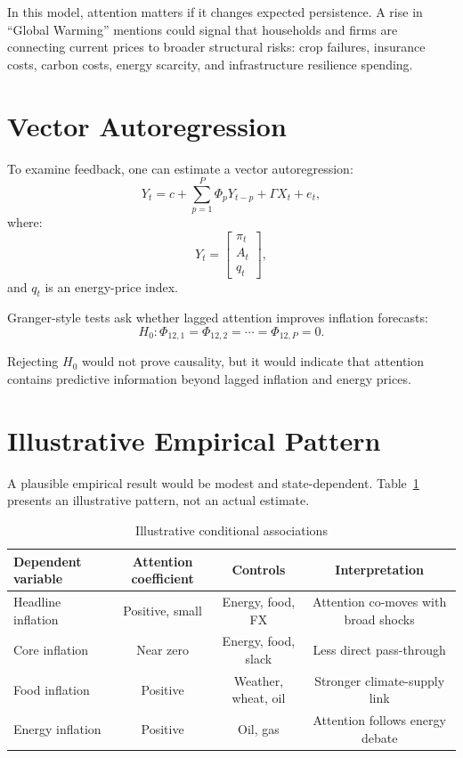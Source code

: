 \documentclass[12pt]{article}
\begin{document}
In this model, attention matters if it changes expected persistence. A rise in ``Global Warming'' mentions could signal that households and firms are connecting current prices to broader structural risks: crop failures, insurance costs, carbon costs, energy scarcity, and infrastructure resilience spending.

\section{Vector Autoregression}

To examine feedback, one can estimate a vector autoregression:
\begin{equation}
    Y_t = c + \sum_{p=1}^{P} \Phi_p Y_{t-p} + \Gamma X_t + e_t,
\end{equation}
where:
\begin{equation}
    Y_t =
    \begin{bmatrix}
    \pi_t \\
    A_t \\
    q_t
    \end{bmatrix},
\end{equation}
and $q_t$ is an energy-price index.

Granger-style tests ask whether lagged attention improves inflation forecasts:
\begin{equation}
    H_0: \Phi_{12,1} = \Phi_{12,2} = \cdots = \Phi_{12,P} = 0.
\end{equation}

Rejecting $H_0$ would not prove causality, but it would indicate that attention contains predictive information beyond lagged inflation and energy prices.

\section{Illustrative Empirical Pattern}

A plausible empirical result would be modest and state-dependent. Table~\ref{tab:illustrative} presents an illustrative pattern, not an actual estimate.

\begin{table}[h]
\centering
\caption{Illustrative conditional associations}
\label{tab:illustrative}
\begin{tabular}{lccc}
\toprule
Dependent variable & Attention coefficient & Controls & Interpretation \\
\midrule
Headline inflation & Positive, small & Energy, food, FX & Attention co-moves with broad shocks \\
Core inflation & Near zero & Energy, food, slack & Less direct pass-through \\
Food inflation & Positive & Weather, wheat, oil & Stronger climate-supply link \\
Energy inflation & Positive & Oil, gas & Attention follows energy debate \\
\bottomrule
\end{tabular}
\end{table}
\end{document}
